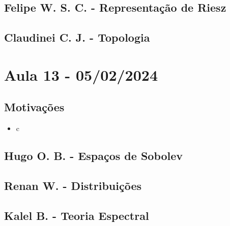 \documentclass{article}
\begin{document}
\subsection{Felipe W. S. C. - Representação de Riesz}
\subsection{Claudinei C. J. - Topologia}
\newpage 

\section{Aula 13 - 05/02/2024}
\subsection{Motivações} 
 \begin{itemize}
   \item c
 \end{itemize}
\subsection{Hugo O. B. - Espaços de Sobolev}
\subsection{Renan W. - Distribuições}
\subsection{Kalel B. - Teoria Espectral}
\end{document}
